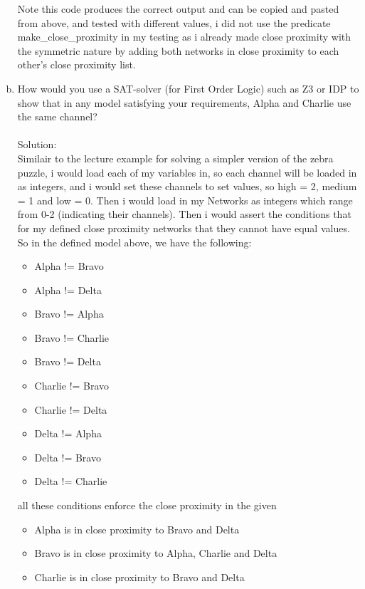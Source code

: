 \documentclass{article}
\newcommand*\moveToRight[1]{\hspace*{0em plus 1fill}\makebox{(#1)}}
\begin{document}
\begin{enumerate}[(a)]
        Note this code produces the correct output and can be copied and pasted from above, and tested with different values, i did not use the predicate make\_close\_proximity in my testing as i already made close proximity with the symmetric nature by adding both networks in close proximity to each other's close proximity list.
        \newpage
        \item How would you use a SAT-solver (for First Order Logic) such as Z3 or IDP to show that in any model satisfying your requirements, Alpha and Charlie use the same channel? \moveToRight{5 marks}\\\\
        Solution:\\
        Similair to the lecture example for solving a simpler version of the zebra puzzle, i would load each of my variables in, so each channel will be loaded in as integers, and i would set these channels to set values, so high = 2, medium = 1 and low = 0. Then i would load in my Networks as integers which range from 0-2 (indicating their channels). Then i would assert the conditions that for my defined close proximity networks that they cannot have equal values. So in the defined model above, we have the following:\\
        \begin{itemize}
            \item Alpha != Bravo
            \item Alpha != Delta
            \item Bravo != Alpha
            \item Bravo != Charlie
            \item Bravo != Delta
            \item Charlie != Bravo
            \item Charlie != Delta
            \item Delta != Alpha
            \item Delta != Bravo
            \item Delta != Charlie
        \end{itemize}
        all these conditions enforce the close proximity in the given
        \begin{itemize}
            \item Alpha is in close proximity to Bravo and Delta
            \item Bravo is in close proximity to Alpha, Charlie and Delta
            \item Charlie is in close proximity to Bravo and Delta

\end{itemize}
\end{enumerate}
\end{document}

